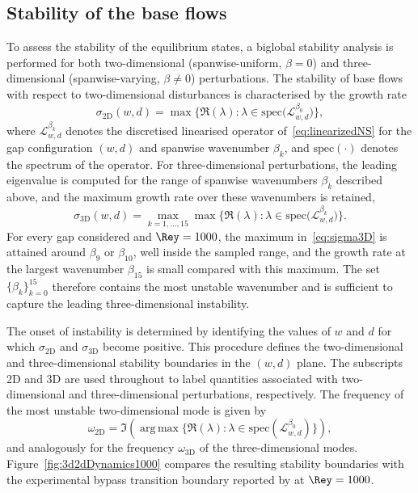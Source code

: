 \documentclass[lineno]{jfm}
\DeclareMathOperator{\argmax}{arg\,max}
\begin{document}
\subsection{Stability of the base flows}
To assess the stability of the equilibrium states, a biglobal stability analysis is performed for both two-dimensional (spanwise-uniform, $\beta=0$) and three-dimensional (spanwise-varying, $\beta\neq0$) perturbations. The stability of base flows with respect to two-dimensional disturbances is characterised by the growth rate
\begin{equation}
	\sigma_{\mathrm{2D}}(w,d)
	=
	\max
	\big\{
	\Re(\lambda):
	\lambda\in
	\mathrm{spec}\big(
	\mathcal{L}_{w,d}^{\beta_0}
	\big)
	\big\},
\end{equation}
where $\mathcal{L}_{w,d}^{\beta_k}$ denotes the discretised linearised operator of~\eqref{eq:linearizedNS} for the gap configuration $(w,d)$ and spanwise wavenumber $\beta_k$, and $\mathrm{spec}(\cdot)$ denotes the spectrum of the operator. For three-dimensional perturbations, the leading eigenvalue is computed for the range of spanwise wavenumbers $\beta_k$ described above, and the maximum growth rate over these wavenumbers is retained,
\begin{equation}\label{eq:sigma3D}
	\sigma_{\mathrm{3D}}(w,d)
	=
	\max_{k=1,\ldots,15}
	\max
	\big\{
	\Re(\lambda):
	\lambda\in
	\mathrm{spec}\big(
		\mathcal{L}_{w,d}^{\beta_k}
	\big)
	\big\}.
\end{equation}
For every gap considered and $\Rey=1000$, the maximum in~\eqref{eq:sigma3D} is attained around $\beta_9$ or $\beta_{10}$, well inside the sampled range, and the growth rate at the largest wavenumber $\beta_{15}$ is small compared with this maximum. The set $\{\beta_k\}_{k=0}^{15}$ therefore contains the most unstable wavenumber and is sufficient to capture the leading three-dimensional instability.

The onset of instability is determined by identifying the values of $w$ and $d$ for which $\sigma_{\mathrm{2D}}$ and $\sigma_{\mathrm{3D}}$ become positive. This procedure defines the two-dimensional and three-dimensional stability boundaries in the $(w,d)$ plane. The subscripts 2D and 3D are used throughout to label quantities associated with two-dimensional and three-dimensional perturbations, respectively. The frequency of the most unstable two-dimensional mode is given by
\begin{equation}
	\omega_{\mathrm{2D}}
	=
	\Im\left(\argmax\big\{\Re(\lambda) : \lambda \in\mathrm{spec}(\mathcal{L}_{w,d}^{\beta_0})\big\}\right),
\end{equation}
and analogously for the frequency $\omega_\mathrm{3D}$ of the three-dimensional modes. Figure~\ref{fig:3d2dDynamics1000} compares the resulting stability boundaries with the experimental bypass transition boundary reported by \citet{jeffGaps} at $\Rey=1000$.
\end{document}
